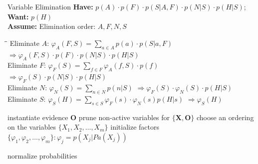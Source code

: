 \begin{frame}{Variable Elimination}{}
	\textbf{Have:} $p(A) \cdot p(F) \cdot p(S \vert A, F) \cdot p(N \vert S) \cdot p(H \vert S)$; \textbf{Want:} $p(H)$ \\
	\textbf{Assume:} Elimination order: $A, F, N, S$
	
	{\footnotesize
	\begin{tabbing}
		\hspace*{3cm}\=\hspace{6cm}\=\kill
		Eliminate $A$:													\>
		$\varphi_A(F, S) = \sum_{a \in A} p(a) \cdot p(S \vert a, F)$ 					\>
		$\Rightarrow \varphi_A(F, S) \cdot p(F) \cdot p(N \vert S) \cdot p(H \vert S) $
		\\[1mm]
		Eliminate $F$:													\>
		$\varphi_F(S) = \sum_{f \in F} \varphi_A(f, S) \cdot p(f)$					\>
		$\Rightarrow \varphi_F(S) \cdot p(N \vert S) \cdot p(H \vert S)$
		\\[1mm]
		Eliminate $N$:													\>
		$\varphi_N(S) = \sum_{n \in N} p(n \vert S)$				 				\>
		$\Rightarrow \varphi_F(S) \cdot \varphi_N(S) \cdot p(H \vert S)$
		\\[1mm]
		Eliminate $S$:													\>
		$\varphi_S(H) = \sum_{s \in S} \varphi_F(s) \cdot \varphi_N(s) p(H \vert s)$		\>
		$\Rightarrow \boxed{\varphi_S(H)}$
	\end{tabbing}}
	
	\begin{boxBlueNoFrame}
		\footnotesize
	\end{boxBlueNoFrame}
\end{frame}


\begin{frame}[plain]{}{}
	\begin{algorithm}[H]
		\DontPrintSemicolon
		\footnotesize

		instantiate evidence $\bm{O}$\;
		prune non-active variables for $\{ \bm{X}, \bm{O} \}$\;
		choose an ordering on the variables $\{X_1, X_2, \dots, X_m\}$\;
		initialize factors $\{\varphi_1, \varphi_2, \dots, \varphi_m\}: \varphi_j = p(X_j \vert Pa(X_j))$\;
		
		normalize probabilities\;		

 		\caption{Variable Elimination Algorithm}
	\end{algorithm}
\end{frame}



